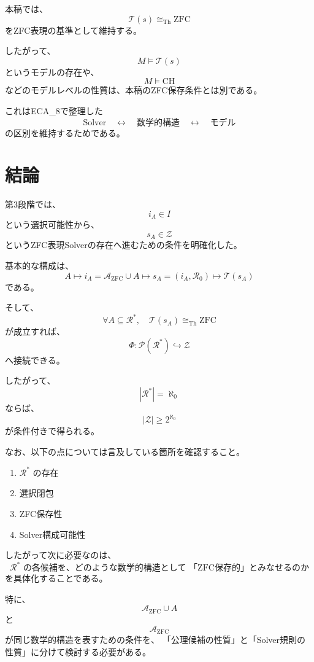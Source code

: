 \documentclass[11pt,a4paper]{article}
\begin{document}
本稿では、
\[
\mathcal T(s)\cong_{\mathrm{Th}}\mathrm{ZFC}
\]
をZFC表現の基準として維持する。

したがって、
\[
M\models\mathcal T(s)
\]
というモデルの存在や、
\[
M\models\mathrm{CH}
\]
などのモデルレベルの性質は、本稿のZFC保存条件とは別である。

これはECA\_8で整理した
\[
\text{Solver}
\quad\longleftrightarrow\quad
\text{数学的構造}
\quad\longleftrightarrow\quad
\text{モデル}
\]
の区別を維持するためである。

\section{結論}

第3段階では、
\[
i_A\in I
\]
という選択可能性から、
\[
s_A\in\mathcal Z
\]
というZFC表現Solverの存在へ進むための条件を明確化した。

基本的な構成は、
\[
A
\longmapsto
i_A
=
\mathcal A_{\mathrm{ZFC}}\cup A
\longmapsto
s_A
=
(i_A,\mathcal R_0)
\longmapsto
\mathcal T(s_A)
\]
である。

そして、
\[
\forall A\subseteq\mathcal R^*,
\quad
\mathcal T(s_A)\cong_{\mathrm{Th}}\mathrm{ZFC}
\]
が成立すれば、
\[
\Phi:\mathcal P(\mathcal R^*)\hookrightarrow\mathcal Z
\]
へ接続できる。

したがって、
\[
|\mathcal R^*|=\aleph_0
\]
ならば、
\[
|\mathcal Z|\geq2^{\aleph_0}
\]
が条件付きで得られる。

なお、以下の点については言及している箇所を確認すること。

\begin{enumerate}
  \item $\mathcal R^*$ の存在
  \item 選択閉包
  \item ZFC保存性
  \item Solver構成可能性
\end{enumerate}



したがって次に必要なのは、
\[
\boxed{
\mathcal R^*
\text{ の各候補を、どのような数学的構造として
「ZFC保存的」とみなせるのか}
}
\]
を具体化することである。

特に、
\[
\mathcal A_{\mathrm{ZFC}}\cup A
\]
と
\[
\mathcal A_{\mathrm{ZFC}}
\]
が同じ数学的構造を表すための条件を、
「公理候補の性質」と「Solver規則の性質」に分けて検討する必要がある。
\end{document}
